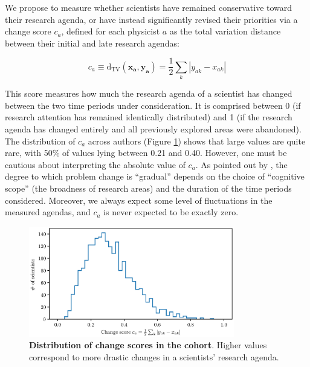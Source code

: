 \documentclass{article}
\begin{document}
We propose to measure whether scientists have remained conservative toward their research agenda, or have instead significantly revised their priorities via a change score $c_a$, defined for each physicist $a$ as the total variation distance between their initial and late research agendas:

\begin{equation}
    c_a \equiv \mathrm{d}_{\text{TV}}(\bm{x_a},\bm{y_a}) = \frac{1}{2} \sum_k |y_{ak}-x_{ak}|
\end{equation}

This score measures how much the research agenda of a scientist has changed between the two time periods under consideration. It is comprised between 0 (if research attention has remained identically distributed) and 1 (if the research agenda has changed entirely and all previously explored areas were abandoned). The distribution of $c_a$ across authors (Figure \ref{fig:change_scores}) shows that large values are quite rare, with 50\% of values lying between 0.21 and 0.40. However, one must be cautious about interpreting the absolute value of $c_a$. As pointed out by \citet{Gieryn1978}, the degree to which problem change is ``gradual'' depends on the choice of ``cognitive scope'' (the broadness of research areas) and the duration of the time periods considered. Moreover, we always expect some level of fluctuations in the measured agendas, and $c_a$ is never expected to be exactly zero.

\begin{figure}[h]
    \centering
        \includegraphics[width=0.8\textwidth]{plots/change_score.eps}
    \caption{\textbf{Distribution of change scores in the cohort}. Higher values correspond to more drastic changes in a scientists' research agenda.}    
    \label{fig:change_scores}
\end{figure}
\end{document}
